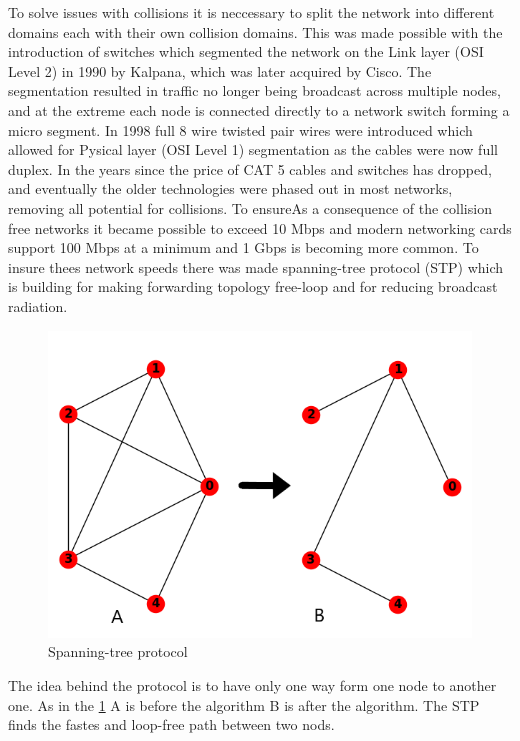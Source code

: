 
To solve issues with collisions it is neccessary to split the network into different domains each with their own collision domains. This was made possible with the introduction of switches which segmented the network on the Link layer (OSI Level 2) in 1990 by Kalpana, which was later acquired by Cisco. The segmentation resulted in traffic no longer being broadcast across multiple nodes, and at the extreme each node is connected directly to a network switch forming a micro segment. In 1998 full 8 wire twisted pair wires were introduced which allowed for Pysical layer (OSI Level 1) segmentation as the cables were now full duplex. In the years since the price of CAT 5 cables and switches has dropped, and eventually the older technologies were phased out in most networks, removing all potential for collisions. To ensureAs a consequence of the collision free networks it became possible to exceed 10 Mbps and modern networking cards support 100 Mbps at a minimum and 1 Gbps is becoming more common. To insure thees network speeds there was made spanning-tree protocol (STP) which is building for making forwarding topology free-loop and for reducing broadcast radiation. 
\begin{figure}[h!]\label{}
	\centering
	\includegraphics[scale=0.5]{realTimeEthernet/Image/STP.png}
	\caption{Spanning-tree protocol}
	\label{fig:STP}
\end{figure}

The idea behind the protocol is to have only one way form one node to another one. As in the \ref{fig:STP} A is before the algorithm B is after the algorithm. The STP finds the fastes and loop-free path between two nods.

